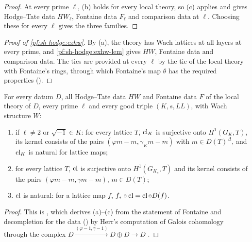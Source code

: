 \begin{proof}
At every prime $\ell$, (b) holds for every local theory, so (c) applies and gives Hodge--Tate data $HW_\ell$, Fontaine data $F_\ell$ and comparison data at
$\ell$. Choosing these for every $\ell$ gives the three families.
\end{proof}

\begin{proof}[Proof of \cref{pf:sh-hodge:exhw}]
By (a), the theory has Wach lattices at all layers at every prime, and \cref{pf:sh-hodge:exhw-lem} gives $HW$, Fontaine data and comparison data. The ties
are provided at every $\ell$ by the tie of the local theory with Fontaine's rings, through which Fontaine's map $\theta$ \cite{Fontaine1994} has the required
properties ().
\end{proof}

\begin{theorem}\label{pf:sh-hodge:herr}
For every datum $D$, all Hodge--Tate data $HW$ and Fontaine data $F$ of the local theory of $D$, every prime $\ell$ and every good triple
$(K,s,\mathit{LL})$, with Wach structure $W$:
\begin{enumerate}[label=(\alph*)]
\item if $\ell\ne2$ or $\sqrt{-1}\in K$: for every lattice $T$, $\operatorname{cl}_K$ is surjective onto $H^1(G_K,T)$, its kernel consists of the
  pairs $(\varphi m-m,\gamma_Km-m)$ with $m\in D(T)^\Delta$, and $\operatorname{cl}_K$ is natural for lattice maps;
\item for every lattice $T$, $\operatorname{cl}$ is surjective onto $H^1(G_{K_s},T)$ and its kernel consists of the pairs $(\varphi m-m,\gamma m-m)$,
  $m\in D(T)$;
\item $\operatorname{cl}$ is natural: for a lattice map $f$, $f_*\circ\operatorname{cl}=\operatorname{cl}\circ D(f)$.
\end{enumerate}
\end{theorem}

\begin{proof}
This is , which derives (a)--(c) from the statement of Fontaine and decompletion for the data
() by Herr's computation of Galois cohomology through the complex
$D\xrightarrow{(\varphi-1,\gamma-1)}D\oplus D\to D$ \cite{Herr1998}.
\end{proof}

